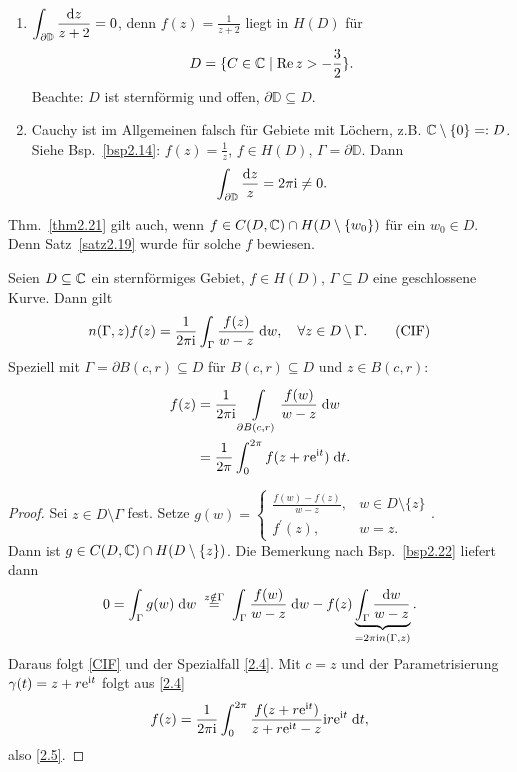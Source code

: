 \documentclass[a4paper,twoside,DIV15,BCOR12mm]{scrbook}
\begin{document}
\begin{bsp} \label{bsp2.22}
  \begin{enumerate}
  \item $\displaystyle\int_{\partial\mathbb{D}}{\frac{\mathrm{d} z}{z+2}}=0$, denn $f(z)=\frac{1}{z+2}$ liegt in $H(D)$ für
    \[D=\{C\in\mathbb{C} \mid \operatorname{Re}{z} > -\frac32\}.\] Beachte: $D$ ist sternförmig und offen, $\partial\mathbb{D}\subseteq D$.
  \item Cauchy ist im Allgemeinen falsch für Gebiete mit Löchern, z.B. $\mathbb{C}\setminus\{0\}=: D$. Siehe Bsp.~\ref{bsp2.14}:
    $f(z)=\frac1z$, $f\in H(D)$, $\Gamma=\partial\mathbb{D}$. Dann \[\int_{\partial\mathbb{D}}{\frac{\mathrm{d} z}{z}} = 2\pi\mathrm{i}
    \neq 0.\]
  \end{enumerate}
\end{bsp}

\begin{bem*}
  Thm.~\ref{thm2.21} gilt auch, wenn $f\in C(D,\mathbb{C}) \cap H(D\setminus\{w_0\})$ für ein $w_0\in D$. Denn Satz~\ref{satz2.19} wurde
  für solche $f$ bewiesen.
\end{bem*}

\begin{thm}
  Seien $D\subseteq\mathbb{C}$ ein sternförmiges Gebiet, $f\in H(D)$, $\Gamma\subseteq D$ eine geschlossene Kurve. Dann gilt
  \begin{equation} \label{CIF}
    n(\Gamma,z) f(z) = \frac{1}{2\pi\mathrm{i}} \int_{\Gamma}^{}{\frac{f(z)}{w-z}}\;\mathrm{d} w, \quad \forall z\in D\setminus\Gamma.
    \tag{CIF}
  \end{equation}
  Speziell mit $\Gamma=\partial B(c,r)\subseteq D$ für $B(c,r)\subseteq D$ und $z\in B(c,r)$:
  \begin{align}
    \label{2.4}
    f(z) &= \frac{1}{2\pi\mathrm{i}} \int\limits_{\partial B(c,r)}^{}{\frac{f(w)}{w-z}}\;\mathrm{d}w \\
    \label{2.5}
    &= \frac{1}{2\pi} \int_{0}^{2\pi}{f(z+r\mathrm{e}^{\mathrm{i} t})}\;\mathrm{d} t.
  \end{align}
\end{thm}
\begin{proof}
  Sei $z\in D\setminus\Gamma$ fest. Setze $\displaystyle g(w) = \begin{cases}
    \frac{f(w)-f(z)}{w-z}, &w\in D\setminus\{z\} \\
    f^\prime(z),            &w=z.
  \end{cases}$.\\
  Dann ist $g\in C(D,\mathbb{C})\cap H(D\setminus\{z\})$. Die Bemerkung nach Bsp.~\ref{bsp2.22} liefert dann
  \[ 0 = \integral{\Gamma}{}{g(w)}{w} \wegen{=}{z\notin\Gamma} \integral{\Gamma}{}{\frac{f(w)}{w-z}}{w} - f(z)
  \underbrace{\int_\Gamma{\frac{\d w}{w-z}}}_{=2\pi\i n(\Gamma,z)}. \]
  Daraus folgt \eqref{CIF} und der Spezialfall \eqref{2.4}. Mit $c=z$ und der Parametrisierung $\gamma(t)=z+r\mathrm{e}^{\mathrm{i} t}$ folgt
  aus \eqref{2.4}
  \[ f(z) = \frac{1}{2\pi\mathrm{i}} \int_{0}^{2\pi}{\frac{f(z+r \mathrm{e}^{\mathrm{i} t})}{z+r \mathrm{e}^{\mathrm{i} t} - z}\mathrm{i} r\mathrm{e}^{\mathrm{i} t}}\;\mathrm{d} t, \]
  also \eqref{2.5}.
\end{proof}
\end{document}
